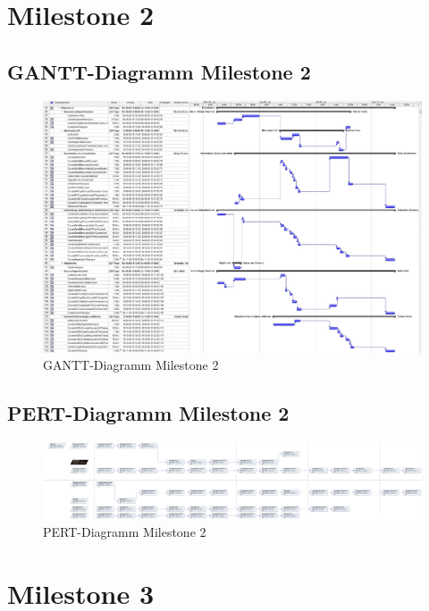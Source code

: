 \section{Milestone 2}
\subsection{GANTT-Diagramm Milestone 2}
\begin{figure}[h]
	\centering
	\includegraphics[width=1.0\linewidth, angle=90]{Grafiken/Milestone2Gantt}
	\caption{GANTT-Diagramm Milestone 2}
	\label{fig:GANTT-Diagramm Milestone 2}
\end{figure}

\clearpage
\subsection{PERT-Diagramm Milestone 2}
\begin{figure}[h]
	\centering
	\includegraphics[width=1.0\linewidth, angle=90]{Grafiken/Milestone2Pert}
	\caption{PERT-Diagramm Milestone 2}
	\label{fig:PERT-Diagramm Milestone 2}
\end{figure}
\clearpage

\section{Milestone 3}
